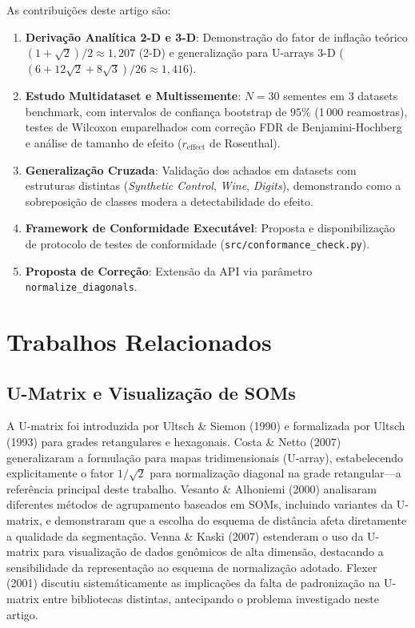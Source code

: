 \documentclass[10pt,journal,compsoc,twocolumn]{IEEEtran}
\begin{document}
As contribui\c{c}\~oes deste artigo s\~ao:
\begin{enumerate}
    \item \textbf{Deriva\c{c}\~ao Anal\'itica 2-D e 3-D}: Demonstra\c{c}\~ao do fator
    de infla\c{c}\~ao te\'orico $(1+\sqrt{2})/2 \approx 1{,}207$ (2-D) e generaliza\c{c}\~ao
    para U-arrays 3-D ($(6+12\sqrt{2}+8\sqrt{3})/26 \approx 1{,}416$).
    \item \textbf{Estudo Multidataset e Multissemente}: $N=30$ sementes
    em 3 datasets benchmark, com intervalos de confian\c{c}a bootstrap de
    $95\%$ (1\,000 reamostras), testes de Wilcoxon emparelhados com
    corre\c{c}\~ao FDR de Benjamini-Hochberg \cite{benjamini1995controlling}
    e an\'alise de tamanho de efeito ($r_\text{effect}$ de Rosenthal).
    \item \textbf{Generaliza\c{c}\~ao Cruzada}: Valida\c{c}\~ao dos achados
    em datasets com estruturas distintas (\textit{Synthetic Control},
    \textit{Wine}, \textit{Digits}), demonstrando como a sobreposi\c{c}\~ao
    de classes modera a detectabilidade do efeito.
    \item \textbf{Framework de Conformidade Execut\'avel}: Proposta e disponibiliza\c{c}\~ao
    de protocolo de testes de conformidade (\texttt{src/conformance\_check.py}).
    \item \textbf{Proposta de Corre\c{c}\~ao}: Extens\~ao da API via
    par\^ametro \texttt{normalize\_diagonals}.
\end{enumerate}

\section{Trabalhos Relacionados}
\label{sec:relacionados}

\subsection{U-Matrix e Visualiza\c{c}\~ao de SOMs}
A U-matrix foi introduzida por Ultsch \& Siemon (1990) \cite{ultsch1990innc}
e formalizada por Ultsch (1993) \cite{ultsch1993self} para grades
retangulares e hexagonais. Costa \& Netto (2007)
\cite{costa2007segmentacao} generalizaram a formula\c{c}\~ao para mapas
tridimensionais (U-array), estabelecendo explicitamente o fator $1/\sqrt{2}$ para
normaliza\c{c}\~ao diagonal na grade retangular---a refer\^encia principal
deste trabalho. Vesanto \& Alhoniemi (2000) \cite{vesanto2000clustering}
analisaram diferentes m\'etodos de agrupamento baseados em SOMs, incluindo
variantes da U-matrix, e demonstraram que a escolha do esquema de dist\^ancia
afeta diretamente a qualidade da segmenta\c{c}\~ao. Venna \& Kaski (2007)
\cite{venna2007visualizing} estenderam o uso da U-matrix para visualiza\c{c}\~ao
de dados gen\^omicos de alta dimens\~ao, destacando a sensibilidade da
representa\c{c}\~ao ao esquema de normaliza\c{c}\~ao adotado. Flexer (2001)
\cite{flexer2001use} discutiu sistem\'aticamente as implica\c{c}\~oes da falta
de padroniza\c{c}\~ao na U-matrix entre bibliotecas distintas, antecipando o
problema investigado neste artigo.
\end{document}
